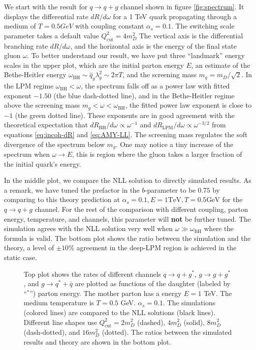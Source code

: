 We start with the result for $q\rightarrow q+g$ channel shown in 
figure \ref{fig:spectrum}.
It displays the differential rate $dR/d\omega$ for a 1 TeV quark propagating through a medium of $T=0.5 GeV$ with coupling constant $\alpha_s = 0.1$.
The switching scale parameter takes a default value $Q_{\textrm{cut}}^2 = 4 m_D^2$
The vertical axis is the differential branching rate $dR/d\omega$, and the horizontal axis is the energy of the final state gluon $\omega$.
To better understand our result, we have put three ``landmark'' energy scales in the upper plot, which are the initial parton energy $E$, an estimate of the Bethe-Heitler energy $\omega_{\textrm{BH}}\sim\hat{q}_g \lambda_g^2 \sim 2\pi T$, and the screening mass $m_g = m_D/\sqrt{2}$.
In the LPM regime $\omega_{\textrm{BH}} < \omega$, the spectrum falls off as a power law with fitted exponent $-1.50$ (the blue dash-dotted line), and in the Bethe-Heitler regime above the screening mass $m_g < \omega < \omega_{\textrm{BH}}$, the fitted power law exponent is close to $-1$ (the green dotted line).
These exponents are in good agreement with the theoretical expectation that $dR_{\textrm{BH}}/d\omega \propto \omega^{-1}$ and $dR_{\textrm{LPM}}/d\omega \propto \omega^{-3/2}$ from equations \ref{eq:incoh-dR} and \ref{eq:AMY-LL}.
The screening mass regulates the soft divergence of the spectrum below $m_g$.
One may notice a tiny increase of the spectrum when $\omega \rightarrow E$, this is region where the gluon takes a larger fraction of the initial quark's energy.

In the middle plot, we compare the NLL solution to directly simulated results.
As a remark, we have tuned the prefactor in the $b$-parameter to be $0.75$  by comparing to this theory prediction at $\alpha_s=0.1, E=1 \textrm{TeV}, T = 0.5 \textrm{GeV}$ for the $q\rightarrow q+g$ channel.
For the rest of the comparison with different coupling, parton energy, temperature, and channels, this parameter will {\bf not} be further tuned.
The simulation agrees with the NLL solution very well when $\omega \gg \omega_{\textrm{BH}}$ where the formula is valid.
The bottom plot shows the ratio between the simulation and the theory, a level of $\pm 10\%$ agreement in the deep-LPM region is achieved in the static case.

\begin{figure}
\singlespacing
{}
\caption[Top plot shows the rates of different channels $q\rightarrow q+g^*$,]{Top plot shows the rates of different channels $q\rightarrow q+g^*$, $g\rightarrow g+g^*$, and $g\rightarrow q^* + \bar{q}$ are plotted as functions of the daughter (labeled by ``${}^*$'') parton energy. The mother parton has a energy $E=1$ TeV. The medium temperature is $T=0.5$ GeV. $\alpha_s = 0.1$. The simulations (colored lines) are compared to the NLL solutions (black lines). Different line shapes use $Q_{\textrm{cut}}^2 = 2m_D^2$ (dashed), $4m_D^2$ (solid), $8m_D^2$ (dash-dotted), and $16 m_D^2$ (dotted).
The ratios between the simulated results and theory are shown in the bottom plot.}
\label{fig:channel_rate}
\end{figure}

